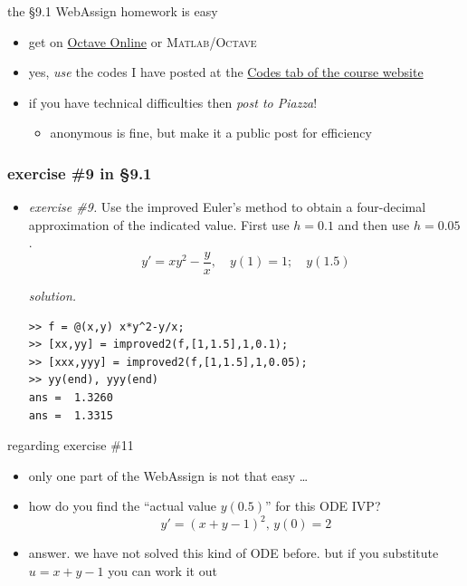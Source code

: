 \documentclass[urlcolor=blue,dvipsnames]{beamer}
\newcommand{\Matlab}{\textsc{Matlab}\xspace}
\newcommand{\Octave}{\textsc{Octave}\xspace}
\begin{document}
\begin{frame}{the \S9.1 WebAssign homework is easy}

\begin{itemize}
\item get on \href{https://octave-online.net/}{Octave Online} or \Matlab/\Octave
\item yes, \emph{use} the codes I have posted at the \href{https://bueler.github.io/math302/codes.html}{Codes tab of the course website}
\item if you have technical difficulties then \emph{post to Piazza}!
    \begin{itemize}
    \item anonymous is fine, but make it a public post for efficiency
    \end{itemize}
\end{itemize}
\end{frame}


\begin{frame}[fragile]
\frametitle{exercise \#9 in \S9.1}

\begin{itemize}
\item \emph{exercise \#9.}  Use the improved Euler's method to obtain a four-decimal approximation of the indicated value.  First use $h=0.1$ and then use $h=0.05$.
    $$y'=xy^2-\frac{y}{x}, \quad y(1)=1; \quad y(1.5)$$

\noindent \emph{solution.}
\begin{Verbatim}[fontsize=\small]
>> f = @(x,y) x*y^2-y/x;
>> [xx,yy] = improved2(f,[1,1.5],1,0.1);
>> [xxx,yyy] = improved2(f,[1,1.5],1,0.05);
>> yy(end), yyy(end)
ans =  1.3260
ans =  1.3315
\end{Verbatim}
\end{itemize}
\end{frame}

\begin{frame}{regarding exercise \#11}

\begin{itemize}
\item only one part of the WebAssign is not that easy \dots
\item how do you find the ``actual value $y(0.5)$'' for this ODE IVP?
    $$y'=(x+y-1)^2, \, y(0)=2$$
\item \alert{answer.}  we have not solved this kind of ODE before.  but if you substitute $u=x+y-1$ you can work it out
\end{itemize}
\end{frame}
\end{document}
